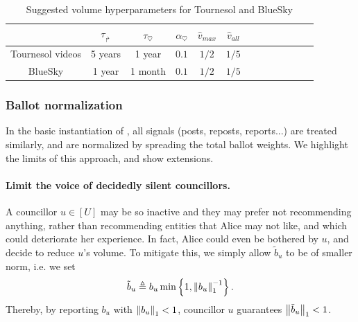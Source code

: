 \begin{table}[h!]
\begin{center}
\begin{tabular}{ |c|c|c|c|c|c|c|c|c|c|c|c|c| } 
 \hline
                    & $\tau_{\Rsh}$ & $\tau_\heartsuit$ & $\alpha_\heartsuit$ & $\hat v_{max}$ & $\hat v_{all}$ \\ \hline
 Tournesol videos   & 5 years       & 1 year            & $0.1$               & $1/2$          & $1/5$          \\ \hline
 BlueSky            & 1 year        & 1 month           & $0.1$               & $1/2$          & $1/5$          \\ 
 \hline
\end{tabular}
\caption{Suggested volume hyperparameters for Tournesol and BlueSky} 
\label{table:volume_hyperparameters}
\end{center}
\end{table}


\subsubsection{Ballot normalization}

In the basic instantiation of \Veche{}, 
all signals (posts, reposts, reports...) are treated similarly,
and are normalized by spreading the total ballot weights.
We highlight the limits of this approach, and show extensions.

\paragraph{Limit the voice of decidedly silent councillors.}
A councillor $u \in [U]$ may be so inactive
and they may prefer not recommending anything,
rather than recommending entities that Alice may not like,
and which could deteriorate her experience.
In fact, Alice could even be bothered by $u$, 
and decide to reduce $u$'s volume.
To mitigate this, we simply allow $\tilde b_u$ to be of smaller norm, i.e. we set
\begin{align}
    \tilde b_u \triangleq b_u \min \left\lbrace  1, \left\lVert{b_u}\right\rVert_{1}^{-1}  \right\rbrace.
\end{align}
Thereby, by reporting $b_u$ with $\left\lVert{b_u}\right\rVert_{1} < 1$,
councillor $u$ guarantees $\left\lVert{\tilde b_u}\right\rVert_{1} < 1$.

